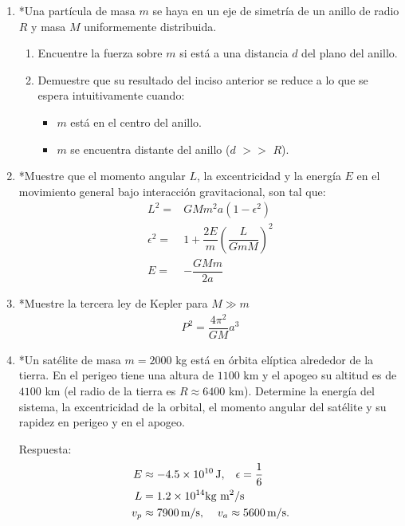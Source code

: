 \documentclass[11pt,twocolumn]{article}
\begin{document}
\begin{enumerate}
\item *Una partícula de masa $m$ se haya en un eje de simetría de un anillo de radio $R$ y masa $M$ uniformemente distribuida.
\begin{enumerate}
\item Encuentre la fuerza sobre $m$ si está a una distancia $d$ del plano del anillo.
\item Demuestre que su resultado del inciso anterior se reduce a lo que se espera intuitivamente cuando:
\begin{itemize}
\item $m$ está en el centro del anillo.
\item $m$ se encuentra distante del anillo ($d$ $>>$ $R$). 
\end{itemize}
\end{enumerate}


\item *Muestre que el momento angular $L$, la excentricidad  y la energía $E$ en el movimiento general bajo interacción gravitacional, son tal que:
\begin{align*}
L^2=&GMm^2a(1-\epsilon^2)\\
\epsilon^2=&1+\dfrac{2E}{m}\left(\dfrac{L}{GmM}\right)^2\\
E=&-\dfrac{GMm}{2a}
\end{align*}

\item *Muestre la tercera ley de Kepler para $M\gg m$
\begin{align*}
P^2=\dfrac{4\pi^2}{GM}a^3
\end{align*}

\item *Un satélite de masa $m = 2000$ kg está en órbita elíptica alrededor de la tierra. 
En el perigeo tiene una altura de $1100$ km y el apogeo su altitud es de $4100$ km (el radio de la tierra es $R\approx 6400$ km). Determine la energía del sistema, la excentricidad  de la  orbital, el momento angular del satélite y su rapidez en perigeo y en el apogeo.

Respuesta:
\begin{align*}
E&\approx-4.5\times 10^{10}\,\text{J},\hspace{0.3 cm} \epsilon=\dfrac{1}{6}\,\\
L&=1.2\times 10^{14} \text{kg m$^2/$s}\\
v_p&\approx7900\, \text{m/s},\;\hspace{0.3 cm} v_a\approx5600\, \text{m/s}.
\end{align*}


\end{enumerate}
\end{document}
